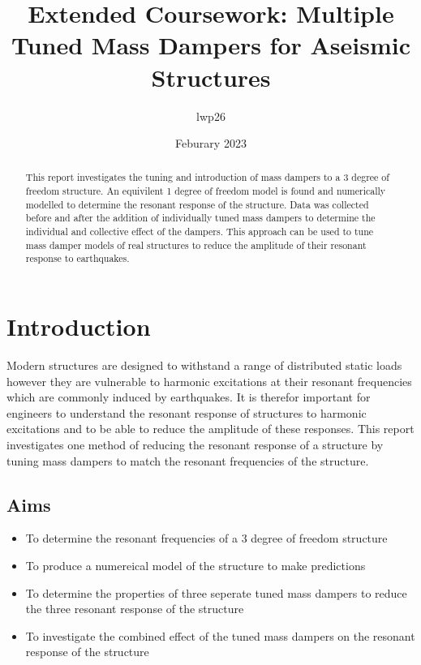 \documentclass[8pt]{article}
\begin{document}

\title{Extended Coursework: Multiple Tuned Mass Dampers for Aseismic Structures}
\author{lwp26}
\date{Feburary 2023}
\maketitle

\begin{abstract}
    \centering
    This report investigates the tuning and introduction of mass dampers to a 3 degree of freedom structure.
    An equivilent 1 degree of freedom model is found and numerically modelled to determine the resonant response of the structure.
    Data was collected before and after the addition of individually tuned mass dampers to determine the individual and collective effect of the dampers.
    This approach can be used to tune mass damper models of real structures to reduce the amplitude of their resonant response to earthquakes.
\end{abstract}

\vspace{-14pt}
\section{Introduction}
\vspace{-14pt}


Modern structures are designed to withstand a range of distributed static loads however they are vulnerable to harmonic excitations at their resonant frequencies which are commonly induced by earthquakes.
It is therefor important for engineers to understand the resonant response of structures to harmonic excitations and to be able to reduce the amplitude of these responses.
This report investigates one method of reducing the resonant response of a structure by tuning mass dampers to match the resonant frequencies of the structure.

\vspace{-14pt}
\subsection{Aims}
\vspace{-14pt}

\begin{itemize}
\item To determine the resonant frequencies of a 3 degree of freedom structure
\item To produce a numereical model of the structure to make predictions 
\item To determine the properties of three seperate tuned mass dampers to reduce the three resonant response of the structure
\item To investigate the combined effect of the tuned mass dampers on the resonant response of the structure
\end{itemize}
\end{document}
